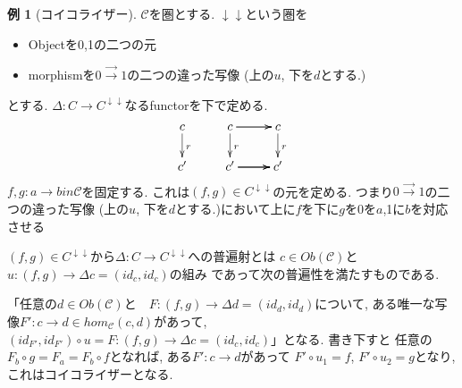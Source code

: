 \documentclass[dvipdfmx,a4paper,11pt]{report}
\theoremstyle{definition}
\newtheorem{exa}[thm]{例}
\begin{document}
\begin{exa}[コイコライザー]
$\mathcal{C} $を圏とする. 
$\downarrow \downarrow$という圏を
\begin{itemize}
\item Objectを0,1の二つの元
\item morphismを$0 \overset{\to}{\to} 1$の二つの違った写像 (上の$u$, 下を$d$とする.)
\end{itemize}
とする.
$\Delta: C \to C^{\downarrow \downarrow}$なるfunctorを下で定める. 
\begin{equation*}
\xymatrix@C=25pt@R=20pt{
c\ar@{->}[d]^{r}&
c \ar@{->}[d]^{r}\ar@{->}[r]\ar@{->}[r]  &
 c \ar@{->}[d]^{r}\\
 c' &
c' \ar@{->}[r] \ar@{->}[r] \ar@{->}[r]& 
c'\\   
}
\end{equation*}
$f,g : a \to b in \mathcal{C}$を固定する.
これは$(f,g) \in C^{\downarrow \downarrow}$の元を定める.
つまり$0 \overset{\to}{\to} 1$の二つの違った写像 (上の$u$, 下を$d$とする.)において上に$f$を下に$g$を0を$a$,1に$b$を対応させる

$(f,g) \in C^{\downarrow \downarrow}$から$\Delta: C \to C^{\downarrow \downarrow}$への普遍射とは
$c \in Ob(\mathcal{C})$と
$u: (f,g)\to \Delta c =(id_c,id_c)$の組み
であって次の普遍性を満たすものである.

「任意の$d \in Ob(\mathcal{C})$と　$F : (f,g)\to \Delta d =(id_d,id_d)$について, ある唯一な写像$F' : c \to d \in hom_{\mathcal{C}}(c,d)$があって, $(id_{F'}, id_{F'}) \circ u = F : (f,g)\to \Delta c =(id_c,id_c)$」となる.
書き下すと
任意の$F_{b} \circ g = F_{a} = F_b \circ f$となれば, ある$F': c \to d$があって
$F ' \circ u_1  = f$, $F' \circ u_2 = g$となり, これはコイコライザーとなる. 
\end{exa}
\end{document}
